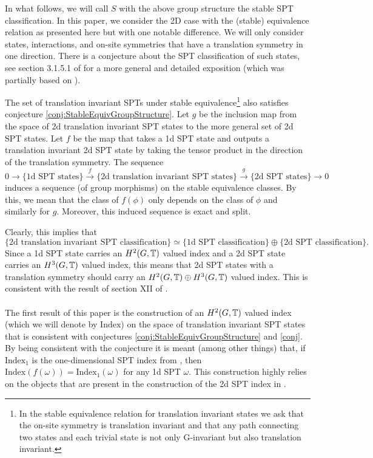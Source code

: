 \documentclass[11pt,a4paper,twoside]{article}
\numberwithin{equation}{section}
\begin{document}
	In what follows, we will call $S$ with the above group structure the stable SPT classification. In this paper, we consider the 2D case with the (stable) equivalence relation as presented here but with one notable difference. We will only consider states, interactions, and on-site symmetries that have a translation symmetry in one direction. There is a conjecture about the SPT classification of such states, see section 3.1.5.1 of \cite{xiong2019classification} for a more general and detailed exposition (which was partially based on \cite{Chen_2013}).
	\begin{conjecture}\label{conj}
		The set of translation invariant SPTs under stable equivalence\footnote{In the stable equivalence relation for translation invariant states we ask that the on-site symmetry is translation invariant and that any path connecting two states and each trivial state is not only G-invariant but also translation invariant.} also satisfies conjecture \ref{conj:StableEquivGroupStructure}. Let $g$ be the inclusion map from the space of 2d translation invariant SPT states to the more general set of 2d SPT states. Let $f$ be the map that takes a 1d SPT state and outputs a translation invariant 2d SPT state by taking the tensor product in the direction of the translation symmetry. The sequence
		\begin{equation}
			0\rightarrow\{\text{1d SPT states}\}\stackrel{f}{\rightarrow}\{\text{2d translation invariant SPT states}\}\stackrel{g}{\rightarrow}\{\text{2d SPT states}\}\rightarrow 0
		\end{equation}
		induces a sequence (of group morphisms) on the stable equivalence classes. By this, we mean that the class of $f(\phi)$ only depends on the class of $\phi$ and similarly for $g$. Moreover, this induced sequence is exact and split.
	\end{conjecture}
	Clearly, this implies that
	\begin{equation}
		\{\text{2d translation invariant SPT classification}\}\simeq \{\text{1d SPT classification}\}\oplus \{\text{2d SPT classification}\}.
	\end{equation}
	Since a 1d SPT state carries an $H^2(G,\mathbb T)$ valued index and a 2d SPT state carries an $H^3(G,\mathbb T)$ valued index, this means that 2d SPT states with a translation symmetry should carry an $H^2(G,\mathbb T)\oplus H^3(G,\mathbb T)$ valued index. This is consistent with the result of section XII of \cite{Chen_2013}.
	\\\\
	The first result of this paper is the construction of an $H^2(G,\mathbb T)$ valued index (which we will denote by $\textrm{Index}$) on the space of translation invariant SPT states that is consistent with conjectures \ref{conj:StableEquivGroupStructure} and \ref{conj}. By being consistent with the conjecture it is meant (among other things) that, if $\textrm{Index}_1$ is the one-dimensional SPT index from \cite{ogata2019classification}, then $\textrm{Index}(f(\omega))=\textrm{Index}_1(\omega)$ for any 1d SPT $\omega$. This construction highly relies on the objects that are present in the construction of the 2d SPT index in \cite{ogata2021h3gmathbb}.
\end{document}
